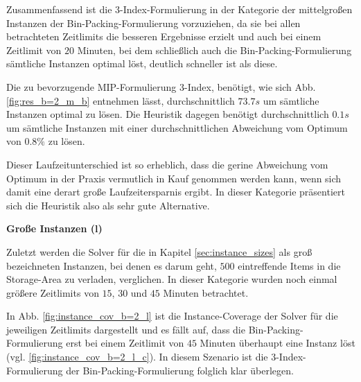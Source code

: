 Zusammenfassend ist die 3-Index-Formulierung in der Kategorie der mittelgroßen Instanzen der Bin-Packing-Formulierung vorzuziehen,
da sie bei allen betrachteten Zeitlimits die besseren Ergebnisse erzielt und auch bei einem Zeitlimit von $20$ Minuten, bei dem schließlich auch die Bin-Packing-Formulierung sämtliche Instanzen optimal löst, deutlich schneller ist als diese.

Die zu bevorzugende MIP-Formulierung 3-Index, benötigt, wie sich Abb. \ref{fig:res_b=2_m_b} entnehmen lässt, durchschnittlich
$73.7s$ um sämtliche Instanzen optimal zu lösen. Die Heuristik dagegen benötigt durchschnittlich $0.1s$ um sämtliche Instanzen
mit einer durchschnittlichen Abweichung vom Optimum von $0.8 \%$ zu lösen.

Dieser Laufzeitunterschied ist so erheblich, dass die gerine Abweichung vom Optimum in der Praxis vermutlich in Kauf genommen werden kann,
wenn sich damit eine derart große Laufzeitersparnis ergibt. In dieser Kategorie präsentiert sich die Heuristik also als sehr gute Alternative.

\textbf{Große Instanzen (l)}

Zuletzt werden die Solver für die in Kapitel \ref{sec:instance_sizes} als groß bezeichneten Instanzen, bei denen es darum geht,
$500$ eintreffende Items in die Storage-Area zu verladen, verglichen. In dieser Kategorie wurden noch einmal größere Zeitlimits von
$15$, $30$ und $45$ Minuten betrachtet.

In Abb. \ref{fig:instance_cov_b=2_l} ist die Instance-Coverage der Solver für die jeweiligen Zeitlimits dargestellt und es fällt auf,
dass die Bin-Packing-Formulierung erst bei einem Zeitlimit von $45$ Minuten überhaupt eine Instanz löst (vgl. \ref{fig:instance_cov_b=2_l_c}).
In diesem Szenario ist die 3-Index-Formulierung der Bin-Packing-Formulierung folglich klar überlegen.

